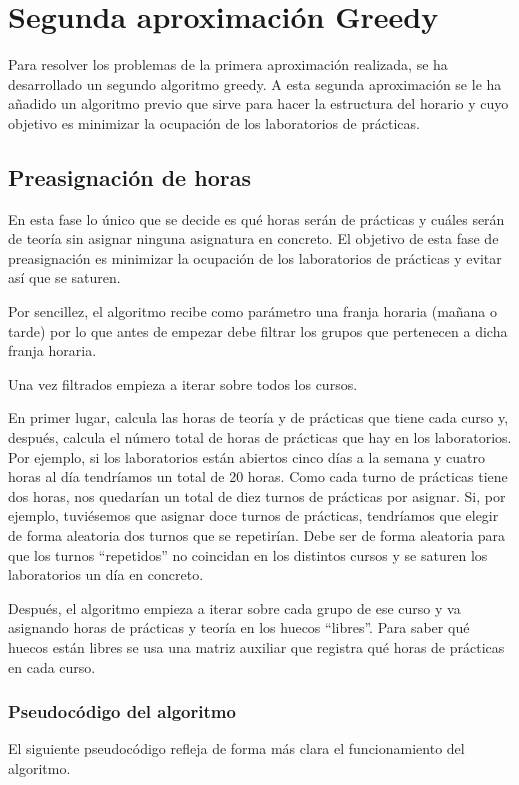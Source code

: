 \chapter{Segunda aproximación Greedy}
Para resolver los problemas de la primera aproximación realizada, se ha desarrollado un segundo algoritmo greedy. A esta segunda aproximación se le ha añadido un algoritmo previo que sirve para hacer la estructura del horario y cuyo objetivo es minimizar la ocupación de los laboratorios de prácticas.

\section{Preasignación de horas}
En esta fase lo único que se decide es qué horas serán de prácticas y cuáles serán de teoría sin asignar ninguna asignatura en concreto. El objetivo de esta fase de preasignación es minimizar la ocupación de los laboratorios de prácticas y evitar así que se saturen.

Por sencillez, el algoritmo recibe como parámetro una franja horaria (mañana o tarde) por lo que antes de empezar debe filtrar los grupos que pertenecen a dicha franja horaria.

Una vez filtrados empieza a iterar sobre todos los cursos. 

En primer lugar, calcula las horas de teoría y de prácticas que tiene cada curso y, después, calcula el número total de horas de prácticas que hay en los laboratorios. Por ejemplo, si los laboratorios están abiertos cinco días a la semana y cuatro horas al día tendríamos un total de 20 horas. Como cada turno de prácticas tiene dos horas, nos quedarían un total de diez turnos de prácticas por asignar. Si, por ejemplo, tuviésemos que asignar doce turnos de prácticas, tendríamos que elegir de forma aleatoria dos turnos que se repetirían. Debe ser de forma aleatoria para que los turnos ``repetidos'' no coincidan en los distintos cursos y se saturen los laboratorios un día en concreto.

Después, el algoritmo empieza a iterar sobre cada grupo de ese curso y va asignando horas de prácticas y teoría en los huecos ``libres''. Para saber qué huecos están libres se usa una matriz auxiliar que registra qué horas de prácticas en cada curso.

\subsection{Pseudocódigo del algoritmo}
El siguiente pseudocódigo refleja de forma más clara el funcionamiento del algoritmo.


